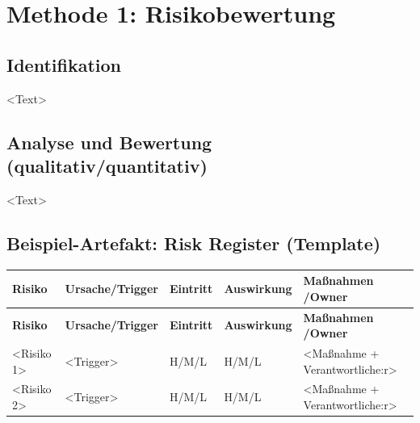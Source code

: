 \section{Methode 1: Risikobewertung}
\subsection{Identifikation}
\textless Text\textgreater

\subsection{Analyse und Bewertung (qualitativ/quantitativ)}
\textless Text\textgreater

\subsection{Beispiel-Artefakt: Risk Register (Template)}
\begin{longtable}{@{}p{3.0cm}p{3.2cm}p{2.1cm}p{2.1cm}p{4.2cm}@{}}
\toprule
\textbf{Risiko} & \textbf{Ursache/\allowbreak Trigger} & \textbf{Eintritt} & \textbf{Aus\allowbreak wirkung} & \textbf{Maßnahmen /\allowbreak Owner} \\
\midrule
\endfirsthead
\toprule
\textbf{Risiko} & \textbf{Ursache/\allowbreak Trigger} & \textbf{Eintritt} & \textbf{Aus\allowbreak wirkung} & \textbf{Maßnahmen /\allowbreak Owner} \\
\midrule
\endhead
\textless Risiko 1\textgreater & \textless Trigger\textgreater & H/M/L & H/M/L & \textless Maßnahme + Verantwortliche:r\textgreater \\
\textless Risiko 2\textgreater & \textless Trigger\textgreater & H/M/L & H/M/L & \textless Maßnahme + Verantwortliche:r\textgreater \\
\bottomrule
\end{longtable}
